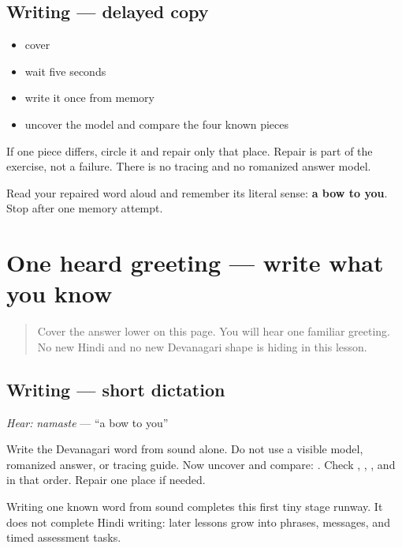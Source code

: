\subsection*{Writing — delayed copy}
\begin{itemize}
\raggedright
  \item cover \textbf{}
  \item wait five seconds
  \item write it once from memory
  \item uncover the model and compare the four known pieces
\end{itemize}

If one piece differs, circle it and repair only that place. Repair is part of the exercise, not a failure. There is no tracing and no romanized answer model.

\begin{tcolorbox}[breakable,colback=teal!4,colframe=teal!35!black,title={Before you move on}]
Read your repaired word aloud and remember its literal sense: \textbf{a bow to you}. Stop after one memory attempt.
\end{tcolorbox}
\section[\texorpdfstring{\hi{नमस्ते} (namaste)}{नमस्ते (namaste)}]{One heard greeting — write what you know}

\label{lesson:HI-W05-namaste-dictation}



\begin{quote}
Cover the answer lower on this page. You will hear one familiar greeting. No new Hindi and no new Devanagari shape is hiding in this lesson.
\end{quote}

\subsection*{Writing — short dictation}
\emph{Hear:} \emph{namaste} — \textquotedblleft{}a bow to you\textquotedblright{}

Write the Devanagari word from sound alone. Do not use a visible model, romanized answer, or tracing guide. Now uncover and compare: \textbf{}. Check \textbf{}, \textbf{}, \textbf{}, and \textbf{} in that order. Repair one place if needed.

\begin{tcolorbox}[breakable,colback=teal!4,colframe=teal!35!black,title={Before you move on}]
Writing one known word from sound completes this first tiny stage runway. It does not complete Hindi writing: later lessons grow into phrases, messages, and timed assessment tasks.
\end{tcolorbox}

